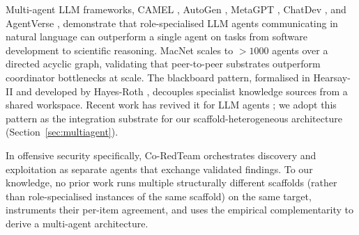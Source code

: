 Multi-agent LLM frameworks, CAMEL \cite{li2023camel}, AutoGen \cite{wu2024autogen}, MetaGPT \cite{hong2024metagpt}, ChatDev \cite{qian2024chatdev}, and AgentVerse \cite{chen2024agentverse}, demonstrate that role-specialised LLM agents communicating in natural language can outperform a single agent on tasks from software development to scientific reasoning. MacNet \cite{macnet2025} scales to $> 1000$ agents over a directed acyclic graph, validating that peer-to-peer substrates outperform coordinator bottlenecks at scale. The blackboard pattern, formalised in Hearsay-II \cite{hearsay1980} and developed by Hayes-Roth \cite{hayesroth1985blackboard}, decouples specialist knowledge sources from a shared workspace. Recent work has revived it for LLM agents \cite{blackboardllm2025,blackboarddatascience2024}; we adopt this pattern as the integration substrate for our scaffold-heterogeneous architecture (Section~\ref{sec:multiagent}).

In offensive security specifically, Co-RedTeam \cite{coredteam2026} orchestrates discovery and exploitation as separate agents that exchange validated findings.  To our knowledge, no prior work runs multiple structurally different scaffolds (rather than role-specialised instances of the same scaffold) on the same target, instruments their per-item agreement, and uses the empirical complementarity to derive a multi-agent architecture.
